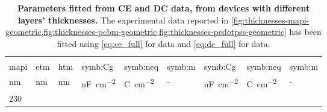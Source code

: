 	\begin{table}%
		\caption[Parameters fitted from CE and DC data, from devices with different layers' thicknesses.]{\textbf{Parameters fitted from CE and DC data, from devices with different layers' thicknesses.}
			The experimental data reported in \cref{fig:thicknesses-mapi-geometric,fig:thicknesses-pcbm-geometric,fig:thicknesses-pedotpss-geometric} has been fitted using \cref{eq:ce_full} for  data and \cref{eq:dc_full} for  data.
		}\label{table:thicknesses_photophysics}
		\centering
		\begin{tabularx}{1.05\linewidth}{@{} >{\hsize}Y | >{\hsize}Y | >{\hsize}Y | Y >{\hsize}Y >{\hsize}Y | Y  >{\hsize}Y >{\hsize}Y @{}}
			 &  & 
			\rule[-1ex]{0pt}{3ex}                                                                                                                                                                                                                                                                                                                                              \\
			\small\gls{mapi}                                   & \small\gls{etm}                        & \small\gls{htm}                       & \small\gls{symb:Cg}                     & \small\gls{symb:neq}                     & \small\gls{symb:m}       & \small\gls{symb:Cg}                     & \small\gls{symb:neq}                     & \small\gls{symb:m}      \\
			\rule[-1ex]{0pt}{2.5ex}  \footnotesize\si{\nm}     & \footnotesize\si{\nm}                  & \footnotesize\si{\nm}                 & \footnotesize\si{\nano\F\per\square\cm} & \footnotesize\si{\coulomb\per\square\cm} & -                        & \footnotesize\si{\nano\F\per\square\cm} & \footnotesize\si{\coulomb\per\square\cm} & -                       \\[1mm]
			\hline
			\rule[-1ex]{0pt}{4ex}
			230                                                &                     &                    &                  &               &   &                  &               &  \\*

\end{tabularx}
\end{table}
